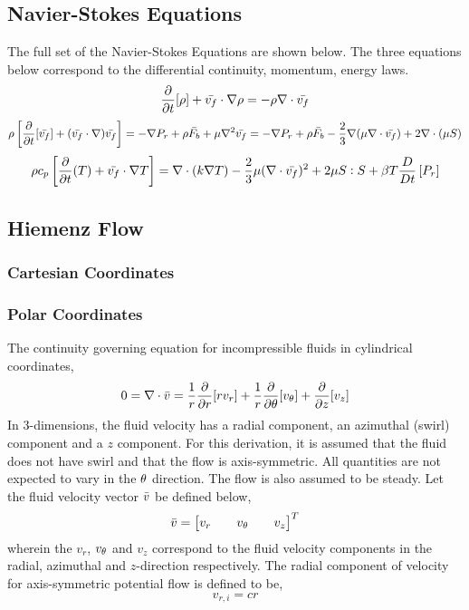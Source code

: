 \documentclass[a4paper, 12pt]{report}
\begin{document}
\begin{center}
\chapter{Navier-Stokes Equations}
\begin{comment}
\end{comment}
The full set of the Navier-Stokes Equations are shown below. The three equations below correspond to the differential continuity, momentum, energy laws.
$$\frac{\partial}{\partial t}[\rho] + \bar{v_f} \cdot \nabla\rho = -\rho \nabla \cdot \bar{v_f}$$
$$\rho \left[\frac{\partial}{\partial t}[\bar{v_f}] + (\bar{v_f} \cdot \nabla) \bar{v_f}\right] = -\nabla P_r + \rho \bar{F_b} + \mu\nabla^2\bar{v_f} = -\nabla P_r + \rho \bar{F_b} - \frac{2}{3}\nabla(\mu\nabla\cdot \bar{v_f}) + 2\nabla\cdot(\mu S)$$
$$\rho c_p\left[\frac{\partial}{\partial t}(T) + \bar{v_f}\cdot\nabla T \right] = \nabla\cdot(k\nabla T) - \frac{2}{3}\mu(\nabla\cdot \bar{v_f})^2 + 2\mu S:S + \beta T \frac{D}{Dt}\left[P_r\right]$$
\section{Hiemenz Flow}
\begin{comment}
\end{comment}
\subsection{Cartesian Coordinates}
\begin{comment}
\end{comment}
\subsection{Polar Coordinates}
\begin{comment}
\end{comment}
The continuity governing equation for incompressible fluids in cylindrical coordinates,
$$0=\nabla\cdot \bar{v} = \frac{1}{r}\frac{\partial}{\partial r}[r v_r] + \frac{1}{r} \frac{\partial}{\partial \theta}[v_\theta] + \frac{\partial}{\partial z}[v_z]$$
In $3$-dimensions, the fluid velocity has a radial component, an azimuthal (swirl) component and a $z$ component. For this derivation, it is assumed that the fluid does not have swirl and that the flow is axis-symmetric. All quantities are not expected to vary in the $\theta$ direction. The flow is also assumed to be steady. Let the fluid velocity vector $\bar{v}$ be defined below,
$$\bar{v} = \begin{bmatrix} v_r && v_\theta && v_z \end{bmatrix}^T$$
wherein the $v_r$, $v_\theta$ and $v_z$ correspond to the fluid velocity components in the radial, azimuthal and $z$-direction respectively. The radial component of velocity for axis-symmetric potential flow is defined to be,
$$v_{r,i} = cr$$


\end{center}
\end{document}
